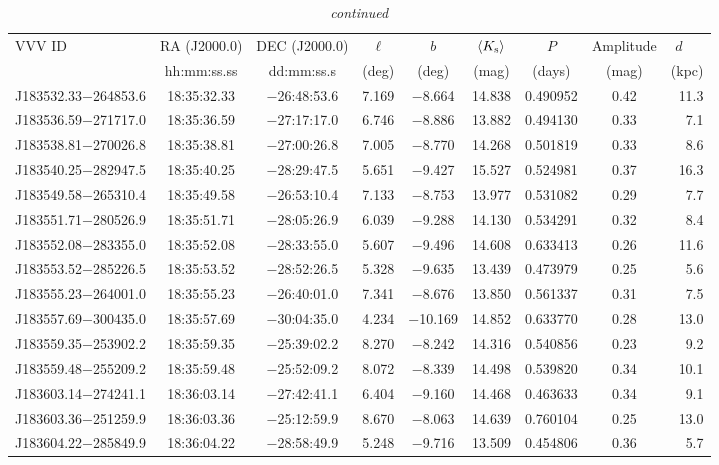 \begin{table*}
\centering
\caption[]{{\it continued}}
\begin{tabular}{lcccccccr}
\hline \hline
VVV ID & RA (J2000.0)  & DEC (J2000.0) & $\ell$ & $b$ &  $\langle K_{\rm s} \rangle$ & $P$ & Amplitude & $d$~~~ \\
     & hh:mm:ss.ss    & dd:mm:ss.s   &  (deg) & (deg) &   (mag)       & (days) & (mag) & (kpc)   \\
\hline
J183532.33$-$264853.6 & 18:35:32.33 & $-$26:48:53.6 &  7.169 & $-$8.664 & 14.838 & 0.490952 & 0.42 & 11.3 \\
J183536.59$-$271717.0 & 18:35:36.59 & $-$27:17:17.0 &  6.746 & $-$8.886 & 13.882 & 0.494130 & 0.33 & 7.1 \\
J183538.81$-$270026.8 & 18:35:38.81 & $-$27:00:26.8 &  7.005 & $-$8.770 & 14.268 & 0.501819 & 0.33 & 8.6 \\
J183540.25$-$282947.5 & 18:35:40.25 & $-$28:29:47.5 &  5.651 & $-$9.427 & 15.527 & 0.524981 & 0.37 & 16.3 \\
J183549.58$-$265310.4 & 18:35:49.58 & $-$26:53:10.4 &  7.133 & $-$8.753 & 13.977 & 0.531082 & 0.29 & 7.7 \\
J183551.71$-$280526.9 & 18:35:51.71 & $-$28:05:26.9 &  6.039 & $-$9.288 & 14.130 & 0.534291 & 0.32 & 8.4 \\
J183552.08$-$283355.0 & 18:35:52.08 & $-$28:33:55.0 &  5.607 & $-$9.496 & 14.608 & 0.633413 & 0.26 & 11.6 \\
J183553.52$-$285226.5 & 18:35:53.52 & $-$28:52:26.5 &  5.328 & $-$9.635 & 13.439 & 0.473979 & 0.25 & 5.6 \\
J183555.23$-$264001.0 & 18:35:55.23 & $-$26:40:01.0 &  7.341 & $-$8.676 & 13.850 & 0.561337 & 0.31 & 7.5 \\
J183557.69$-$300435.0 & 18:35:57.69 & $-$30:04:35.0 &  4.234 & $-$10.169 & 14.852 & 0.633770 & 0.28 & 13.0 \\
J183559.35$-$253902.2 & 18:35:59.35 & $-$25:39:02.2 &  8.270 & $-$8.242 & 14.316 & 0.540856 & 0.23 & 9.2 \\
J183559.48$-$255209.2 & 18:35:59.48 & $-$25:52:09.2 &  8.072 & $-$8.339 & 14.498 & 0.539820 & 0.34 & 10.1 \\
J183603.14$-$274241.1 & 18:36:03.14 & $-$27:42:41.1 &  6.404 & $-$9.160 & 14.468 & 0.463633 & 0.34 & 9.1 \\
J183603.36$-$251259.9 & 18:36:03.36 & $-$25:12:59.9 &  8.670 & $-$8.063 & 14.639 & 0.760104 & 0.25 & 13.0 \\
J183604.22$-$285849.9 & 18:36:04.22 & $-$28:58:49.9 &  5.248 & $-$9.716 & 13.509 & 0.454806 & 0.36 & 5.7 \\

\end{tabular}
\end{table*}

